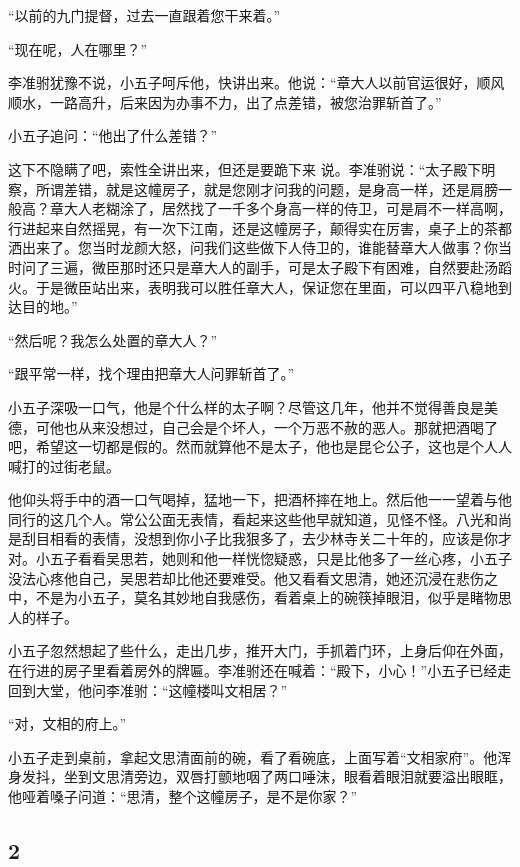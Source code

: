 “以前的九门提督，过去一直跟着您干来着。”

“现在呢，人在哪里？”

李准驸犹豫不说，小五子呵斥他，快讲出来。他说：“章大人以前官运很好，顺风顺水，一路高升，后来因为办事不力，出了点差错，被您治罪斩首了。”

小五子追问：“他出了什么差错？”

这下不隐瞒了吧，索性全讲出来，但还是要跪下来
说。李准驸说：“太子殿下明察，所谓差错，就是这幢房子，就是您刚才问我的问题，是身高一样，还是肩膀一般高？章大人老糊涂了，居然找了一千多个身高一样的侍卫，可是肩不一样高啊，行进起来自然摇晃，有一次下江南，还是这幢房子，颠得实在厉害，桌子上的茶都洒出来了。您当时龙颜大怒，问我们这些做下人侍卫的，谁能替章大人做事？你当时问了三遍，微臣那时还只是章大人的副手，可是太子殿下有困难，自然要赴汤蹈火。于是微臣站出来，表明我可以胜任章大人，保证您在里面，可以四平八稳地到达目的地。”

“然后呢？我怎么处置的章大人？”

“跟平常一样，找个理由把章大人问罪斩首了。”

小五子深吸一口气，他是个什么样的太子啊？尽管这几年，他并不觉得善良是美德，可他也从来没想过，自己会是个坏人，一个万恶不赦的恶人。那就把酒喝了吧，希望这一切都是假的。然而就算他不是太子，他也是昆仑公子，这也是个人人喊打的过街老鼠。

他仰头将手中的酒一口气喝掉，猛地一下，把酒杯摔在地上。然后他一一望着与他同行的这几个人。常公公面无表情，看起来这些他早就知道，见怪不怪。八光和尚是刮目相看的表情，没想到你小子比我狠多了，去少林寺关二十年的，应该是你才对。小五子看看吴思若，她则和他一样恍惚疑惑，只是比他多了一丝心疼，小五子没法心疼他自己，吴思若却比他还要难受。他又看看文思清，她还沉浸在悲伤之中，不是为小五子，莫名其妙地自我感伤，看着桌上的碗筷掉眼泪，似乎是睹物思人的样子。

小五子忽然想起了些什么，走出几步，推开大门，手抓着门环，上身后仰在外面，在行进的房子里看着房外的牌匾。李准驸还在喊着：“殿下，小心！”小五子已经走回到大堂，他问李准驸：“这幢楼叫文相居？”

“对，文相的府上。”

小五子走到桌前，拿起文思清面前的碗，看了看碗底，上面写着“文相家府”。他浑身发抖，坐到文思清旁边，双唇打颤地咽了两口唾沫，眼看着眼泪就要溢出眼眶，他哑着嗓子问道：“思清，整个这幢房子，是不是你家？”
\newline

{\centering\subsection{2}}

